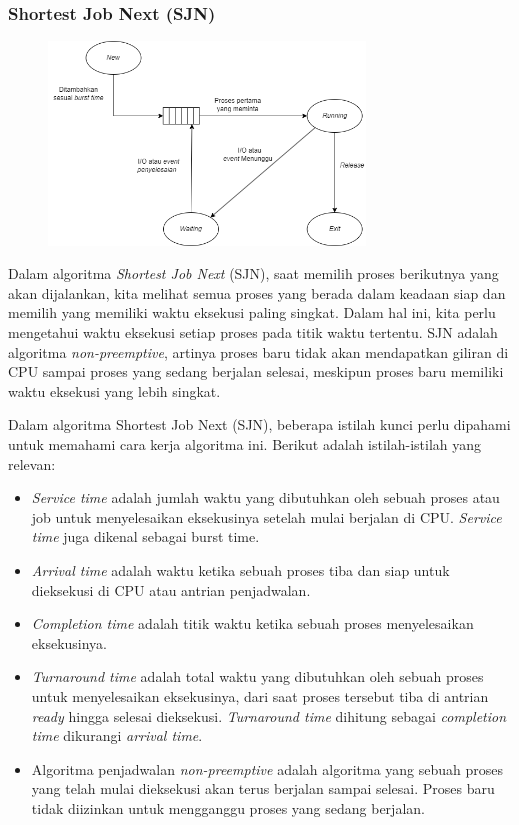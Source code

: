 \documentclass[12pt]{article}
\begin{document}
    \subsubsection{Shortest Job Next (SJN)}
    \begin{figure}[h]
    \centering
    \includegraphics[width=0.75\textwidth]{assets/SJN 2.1.png}
    \label{fig:diagram}
    \end{figure}
     \hspace{1cm} Dalam algoritma \textit{Shortest Job Next} (SJN), saat memilih proses berikutnya yang akan dijalankan, kita melihat semua proses yang berada dalam keadaan siap dan memilih yang memiliki waktu eksekusi paling singkat. Dalam hal ini, kita perlu mengetahui waktu eksekusi setiap proses pada titik waktu tertentu. SJN adalah algoritma \textit{non-preemptive}, artinya proses baru tidak akan mendapatkan giliran di CPU sampai proses yang sedang berjalan selesai, meskipun proses baru memiliki waktu eksekusi yang lebih singkat.

    \hspace{1cm} Dalam algoritma Shortest Job Next (SJN), beberapa istilah kunci perlu dipahami untuk memahami cara kerja algoritma ini. Berikut adalah istilah-istilah yang relevan: 
    
    \begin{itemize}
        \item \textit{Service time} adalah jumlah waktu yang dibutuhkan oleh sebuah proses atau job untuk menyelesaikan eksekusinya setelah mulai berjalan di CPU. \textit{Service time} juga dikenal sebagai burst time.
        \item \textit{Arrival time} adalah waktu ketika sebuah proses tiba dan siap untuk dieksekusi di CPU atau antrian penjadwalan.
        \item \textit{Completion time} adalah titik waktu ketika sebuah proses menyelesaikan eksekusinya.
        \item \textit{Turnaround time} adalah total waktu yang dibutuhkan oleh sebuah proses untuk menyelesaikan eksekusinya, dari saat proses tersebut tiba di antrian \textit{ready} hingga selesai dieksekusi. \textit{Turnaround time} dihitung sebagai \textit{completion time} dikurangi \textit{arrival time}.
        \item Algoritma penjadwalan \textit{non-preemptive} adalah  algoritma yang sebuah proses yang telah mulai dieksekusi akan terus berjalan sampai selesai. Proses baru tidak diizinkan untuk mengganggu proses yang sedang berjalan. 
    \end{itemize}
    
\end{document}
